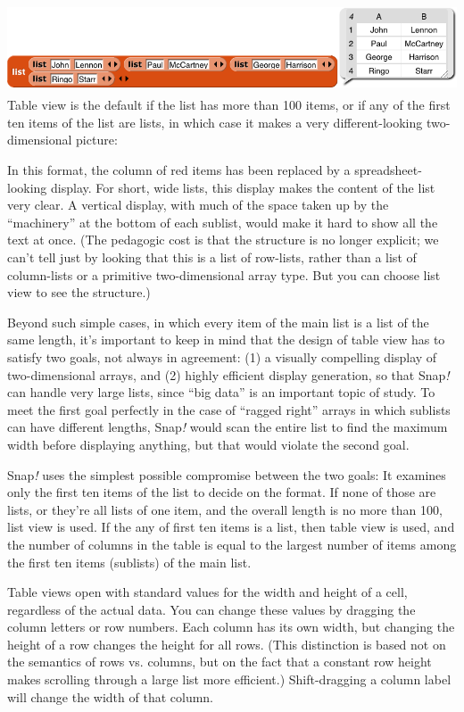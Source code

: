 \includegraphics[width=5.88889in,height=1.04861in]{media/image538.png}Table
view is the default if the list has more than 100 items, or if any of
the first ten items of the list are lists, in which case it makes a very
different-looking two-dimensional picture:

In this format, the column of red items has been replaced by a
spreadsheet-looking display. For short, wide lists, this display makes
the content of the list very clear. A vertical display, with much of the
space taken up by the ``machinery'' at the bottom of each sublist, would
make it hard to show all the text at once. (The pedagogic cost is that
the structure is no longer explicit; we can't tell just by looking that
this is a list of row-lists, rather than a list of column-lists or a
primitive two-dimensional array type. But you can choose list view to
see the structure.)

Beyond such simple cases, in which every item of the main list is a list
of the same length, it's important to keep in mind that the design of
table view has to satisfy two goals, not always in agreement: (1) a
visually compelling display of two-dimensional arrays, and (2) highly
efficient display generation, so that Snap\emph{!} can handle very large
lists, since ``big data'' is an important topic of study. To meet the
first goal perfectly in the case of ``ragged right'' arrays in which
sublists can have different lengths, Snap\emph{!} would scan the entire
list to find the maximum width before displaying anything, but that
would violate the second goal.

Snap\emph{!} uses the simplest possible compromise between the two
goals: It examines only the first ten items of the list to decide on the
format. If none of those are lists, or they're all lists of one item,
and the overall length is no more than 100, list view is used. If the
any of first ten items is a list, then table view is used, and the
number of columns in the table is equal to the largest number of items
among the first ten items (sublists) of the main list.

Table views open with standard values for the width and height of a
cell, regardless of the actual data. You can change these values by
dragging the column letters or row numbers. Each column has its own
width, but changing the height of a row changes the height for all rows.
(This distinction is based not on the semantics of rows vs. columns, but
on the fact that a constant row height makes scrolling through a large
list more efficient.) Shift-dragging a column label will change the
width of that column.

